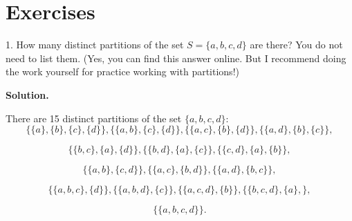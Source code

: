 \documentclass[10pt,]{book}
\theoremstyle{plain}
\theoremstyle{definition}
\theoremstyle{definition}
\theoremstyle{definition}
\theoremstyle{definition}
\numberwithin{equation}{section}
\begin{document}
\section[{Exercises}]{Exercises}\label{exercises-8}
\begin{exerciselist}
\item[1.]\hypertarget{exercise-50}{}
        How many distinct partitions of the set
        \(S=\{a,b,c,d\}\) are there? You do not need to list them.
        (Yes, you can find this answer online. But I recommend
        doing the work yourself for practice working with
        partitions!)
\par\smallskip
\par\smallskip
\noindent\textbf{Solution.}\hypertarget{solution-50}{}\quad

      There are 15 distinct partitions of the set \(\{a,b,c,d\}\):
\begin{equation*}

        \{\{a\},\{b\},\{c\},\{d\}\}, \{\{a,b\},\{c\},\{d\}\},\{\{a,c\},\{b\},\{d\}\},\{\{a,d\},\{b\},\{c\}\},
      
\end{equation*}

\begin{equation*}

        \{\{b,c\},\{a\},\{d\}\},\{\{b,d\},\{a\},\{c\}\},\{\{c,d\},\{a\},\{b\}\},
      
\end{equation*}

\begin{equation*}

        \{\{a,b\},\{c,d\}\},
        \{\{a,c\},\{b,d\}\},\{\{a,d\},\{b,c\}\},
      
\end{equation*}

\begin{equation*}

        \{\{a,b,c\},\{d\}\},\{\{a,b,d\},\{c\}\},\{\{a,c,d\},\{b\}\},\{\{b,c,d\},\{a\},\},
      
\end{equation*}

%
\begin{equation*}

      \{\{a,b,c,d\}\}.
    

\end{equation*}
\end{exerciselist}
\end{document}
